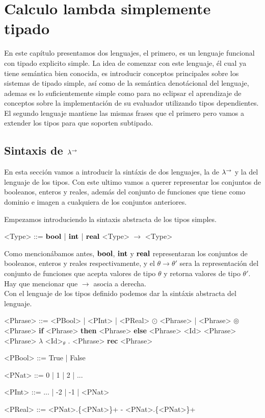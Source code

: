 \chapter{Calculo lambda simplemente tipado}
\label{chap:lambdaarrow}

En este cap\'itulo presentamos dos lenguajes, el primero, es un
lenguaje funcional con tipado explicito simple. La idea de comenzar con 
este lenguaje, \'el cual ya tiene sem\'antica bien conocida, es introducir
conceptos principales sobre los sistemas de tipado simple, as\'i
como de la sem\'antica denot\'acional del lenguaje, ademas es lo 
suficientemente simple como para no eclipsar el aprendizaje de 
conceptos sobre la implementaci\'on de su evaluador utilizando 
tipos dependientes.
El segundo lenguaje mantiene las mismas frases que el primero
pero vamos a extender los tipos para que soporten subtipado.

\section{Sintaxis de $\lambda^{\rightarrow}$}

En esta secci\'on vamos a introducir la sint\'axis de dos lenguajes, 
la de $\lambda^{\rightarrow}$ y la del lenguaje de los tipos.
Con este ultimo vamos a querer representar los conjuntos de booleanos, enteros
y reales, adem\'as del conjunto de funciones que tiene como dominio
e imagen a cualquiera de los conjuntos anteriores.

Empezamos introduciendo la sintaxis abstracta de los tipos simples.

\setlength{\grammarindent}{6em}
\begin{grammar}

<Type> ::= $\textbf{bool}$ | $\textbf{int}$ | $\textbf{real}$
\alt <Type> $\rightarrow$ <Type>

\end{grammar}

Como mencion\'abamos antes, $\textbf{bool}$, $\textbf{int}$ y $\textbf{real}$ representaran 
los conjuntos de booleanos, enteros y reales respectivamente, y el
$\theta \rightarrow \theta'$ sera la representaci\'on del conjunto
de funciones que acepta valores de tipo $\theta$ y retorna valores
de tipo $\theta'$. Hay que mencionar que $\rightarrow$ asocia a derecha.\\

Con el lenguaje de los tipos definido podemos dar la sint\'axis
abstracta del lenguaje.

\setlength{\grammarindent}{6em}
\begin{grammar}

<Phrase> ::= <PBool> | <PInt> | <PReal>
\alt $\odot$ <Phrase> | <Phrase> $\circledcirc$ <Phrase>
\alt \textbf{if} <Phrase> \textbf{then} <Phrase> \textbf{else} <Phrase>
\alt <Id> 
\alt <Phrase> <Phrase>
\alt $\lambda$ <Id>$_\theta$ . <Phrase>
\alt \textbf{rec} <Phrase>

<PBool> ::= True | False

<PNat>  ::= 0 | 1 | 2 | ...

<PInt>  ::= ... | -2 | -1 | <PNat> 

<PReal> ::= <PNat>.\{<PNat>\}+ 
\alt - <PNat>.\{<PNat>\}+

\end{grammar}

